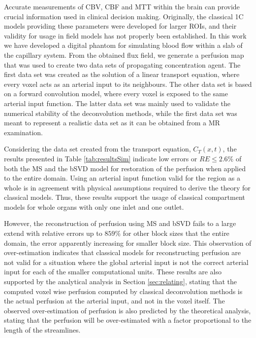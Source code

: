 \documentclass[paper=a4, fontsize=11pt,parskip=half,headings=small]{scrartcl}
\begin{document}
	Accurate measurements of CBV, CBF and MTT within the brain can provide crucial information used in clinical decision making. Originally, the classical 1C models providing these parameters were developed for larger ROIs, and their validity for usage in field models has not properly been established. In this work we have developed a digital phantom for simulating blood flow within a slab of the capillary system. From the obtained flux field, we generate a perfusion map that was used to create two data sets of propagating concentration agent. The first data set was created as the solution of a linear transport equation, where every voxel acts as an arterial input to its neighbours. The other data set is based on a forward convolution model, where every voxel is exposed to the same arterial input function. The latter data set was mainly used to validate the numerical stability of the deconvolution methods, while the first data set was meant to represent a realistic data set as it can be obtained from a MR examination.
	
	Considering the data set created from the transport equation, $C_T(x,t)$, the results presented in Table \ref{tab:resultsSim} indicate low errors or $RE \leq 2.6 \%$ of both the MS and the bSVD model for restoration of the perfusion when applied to the entire domain. Using an arterial input function valid for the region as a whole is in agreement with physical assumptions required to derive the theory for classical models. Thus, these results support the usage of classical compartment models for whole organs with only one inlet and one outlet. 

However, the reconstruction of perfusion using MS and bSVD fails to a large extend with relative errors up to $859 \%$ for other block sizes that the entire domain, the error  apparently increasing for smaller block size. This observation of over-estimation indicates that classical models for reconstructing perfusion are not valid for a situation where the global arterial input is not the correct arterial input for each of the smaller computational units. These results are also supported by the analytical analysis in Section \ref{sec:relating}, stating that the computed voxel wise perfusion computed by classical deconvolution methods is the actual perfusion at the arterial input, and not in the voxel itself. The observed over-estimation of perfusion is also predicted by the theoretical analysis, stating that the perfusion will be over-estimated with a factor proportional to the length of the streamlines. 
\end{document}
